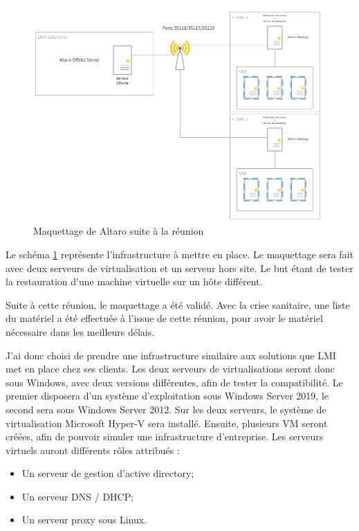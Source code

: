 \documentclass[pfe]{tnreport} %
\begin{document}
\begin{figure}[ht]
 \centering
 \includegraphics[width=15cm]{figures/maquettagev2.png}
 \caption{Maquettage de Altaro suite à la réunion}
 \label{fig:maquettage_v2}
\end{figure}
Le schéma \ref{fig:maquettage_v2} représente l'infrastructure à mettre en place. \newline
Le maquettage sera fait avec deux serveurs de virtualisation et un serveur hors site. Le but étant de tester la restauration d'une machine virtuelle sur un hôte différent.

Suite à cette réunion, le maquettage a été validé. \newline
Avec la crise sanitaire, une liste du matériel a été effectuée à l'issue de cette réunion, pour avoir le matériel nécessaire dans les meilleurs délais. \newline

J'ai donc choisi de prendre une infrastructure similaire aux solutions que LMI met en place chez ses clients. \newline
Les deux serveurs de virtualisations seront donc sous Windows, avec deux versions différentes, afin de tester la compatibilité. Le premier disposera d'un système d'exploitation sous Windows Server 2019, le second sera sous Windows Server 2012. \newline
Sur les deux serveurs, le système de virtualisation Microsoft Hyper-V sera installé. \newline
Ensuite, plusieurs VM seront créées, afin de pouvoir simuler une infrastructure d'entreprise. \newline
Les serveurs virtuels auront différents rôles attribués : \newline
\begin{itemize}
 \item Un serveur de gestion d'active directory;
 \item Un serveur DNS / DHCP;
 \item Un serveur proxy sous Linux. \newline
\end{itemize}
\end{document}
